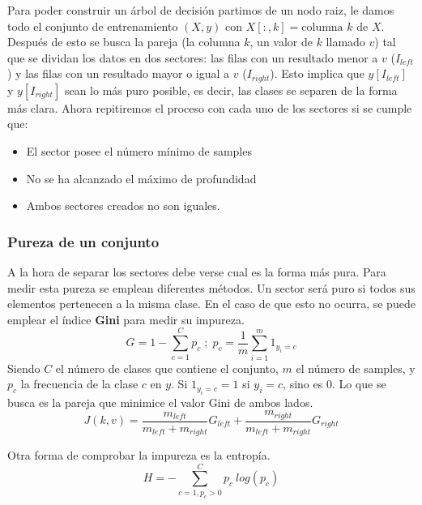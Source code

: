 \documentclass[11pt]{article}
\theoremstyle{plain}
\begin{document}
            Para poder construir un árbol de decisión partimos de un nodo raiz, le damos todo el conjunto de entrenamiento $(X,y)$ con $X[:,k] = \text{columna $k$ de $X$}$. Después de esto se busca la pareja (la columna $k$, un valor de $k$ llamado $v$) tal que se dividan los datos en dos sectores: las filas con un resultado menor a $v$ ($I_{left}$) y las filas con un resultado mayor o igual a $v$ ($I_{right}$). Esto implica que $y[I_{left}]$ y $y[I_{right}]$ sean lo más puro posible, es decir, las clases se separen de la forma más clara. Ahora repitiremos el proceso con cada uno de los sectores si se cumple que:
            \begin{itemize}
                \item El sector posee el número mínimo de samples
                \item No se ha alcanzado el máximo de profundidad
                \item Ambos sectores creados no son iguales. 
            \end{itemize}

            \subsubsection{Pureza de un conjunto} %
            \label{subsub:pureza_de_un_conjunto}
                A la hora de separar los sectores debe verse cual es la forma más pura. Para medir esta pureza se emplean diferentes métodos. Un sector será puro si todos sus elementos pertenecen a la misma clase. En el caso de que esto no ocurra, se puede emplear el índice \textbf{Gini} para medir su impureza.
                \begin{equation}
                    G = 1 - \sum_{c=1}^{C} p_c  \; {;} \;  p_c = \frac{1}{m} \sum_{i=1}^{m} 1_{y_i = c}
                \end{equation}
                Siendo $C$ el número de clases que contiene el conjunto, $m$ el número de samples, y $p_c$ la frecuencia de la clase $c$ en $y$. Si $1_{y_i =  c} = 1$ si $y_i = c$, sino es 0. Lo que se busca es la pareja que minimice el valor Gini de ambos lados.
                \[J(k,v) = \frac{m_{left}}{m_{left}+m_{right}} G_{left} + \frac{m_{right}}{m_{left}+m_{right}}G_{right} \tag{Función de coste}\]

                Otra forma de comprobar la impureza es la entropía.
                \begin{equation}
                     H = - \sum_{c = 1, p_c > 0}^{C} p_c \ log(p_c)
                 \end{equation} 
\end{document}
